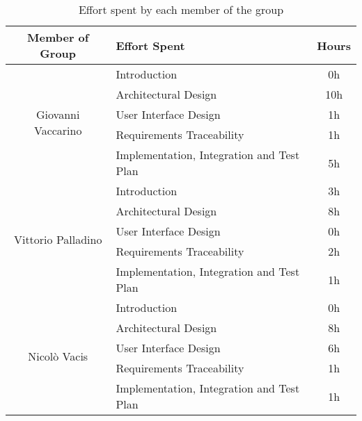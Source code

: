 \begin{table}[ht!]
\centering
\renewcommand{\arraystretch}{1.6}
\begin{tabular}{|c|l|c|}
\hline
\textbf{Member of Group} & \textbf{Effort Spent} & \textbf{Hours} \\ \hline
\multirow{5}{*}{Giovanni Vaccarino}
    & Introduction & 0h \\ \cline{2-3}
    & Architectural Design & 10h \\ \cline{2-3}
    & User Interface Design & 1h \\ \cline{2-3}
    & Requirements Traceability & 1h \\ \cline{2-3}
    & Implementation, Integration and Test Plan & 5h \\ \hline
\multirow{5}{*}{Vittorio Palladino}
    & Introduction & 3h \\ \cline{2-3}
    & Architectural Design & 8h \\ \cline{2-3}
    & User Interface Design & 0h \\ \cline{2-3}
    & Requirements Traceability & 2h \\ \cline{2-3}
    & Implementation, Integration and Test Plan & 1h \\ \hline
\multirow{5}{*}{Nicolò Vacis}
    & Introduction & 0h \\ \cline{2-3}
    & Architectural Design & 8h \\ \cline{2-3}
    & User Interface Design & 6h \\ \cline{2-3}
    & Requirements Traceability & 1h \\ \cline{2-3}
    & Implementation, Integration and Test Plan & 1h \\ \hline
\end{tabular}
\caption{Effort spent by each member of the group}
\end{table}
